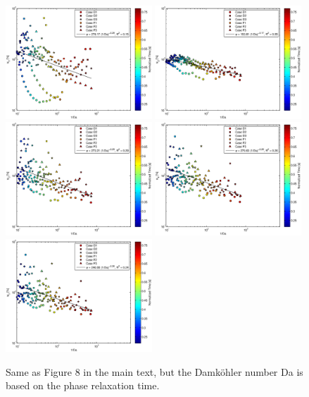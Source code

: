 \documentclass{article}
\begin{document}
\begin{figure}\centering
\includegraphics[width=0.49\textwidth]{Figures/phi1da_phase}
\includegraphics[width=0.49\textwidth]{Figures/phi2da_phase}\\
\includegraphics[width=0.49\textwidth]{Figures/phi3da_phase}
\includegraphics[width=0.49\textwidth]{Figures/phi4da_phase}\\
\includegraphics[width=0.49\textwidth]{Figures/phi5da_phase}
\caption{Same as Figure 8 in the main text, but the Damköhler number Da is based on the
phase relaxation time.}
\end{figure}
\end{document}
